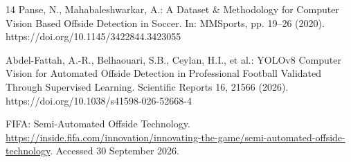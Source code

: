 \documentclass[runningheads]{llncs}
\begin{document}
\begin{thebibliography}{14}
Panse, N., Mahabaleshwarkar, A.: A Dataset \& Methodology for Computer Vision Based Offside Detection in Soccer. In: MMSports, pp. 19--26 (2020). https://doi.org/10.1145/3422844.3423055

Abdel-Fattah, A.-R., Belhaouari, S.B., Ceylan, H.I., et al.: YOLOv8 Computer Vision for Automated Offside Detection in Professional Football Validated Through Supervised Learning. Scientific Reports 16, 21566 (2026). https://doi.org/10.1038/s41598-026-52668-4

FIFA: Semi-Automated Offside Technology. \url{https://inside.fifa.com/innovation/innovating-the-game/semi-automated-offside-technology}. Accessed 30 September 2026.
\end{thebibliography}
\end{document}
